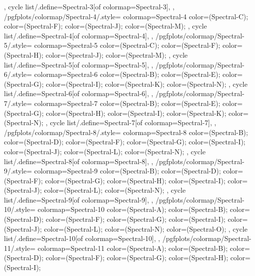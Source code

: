 {{{    },
    cycle list/.define={Spectral-3}{[of colormap=Spectral-3]},
  },
  /pgfplots/colormap/Spectral-4/.style={
    colormap={Spectral-4}{
      color=(Spectral-C);
      color=(Spectral-F);
      color=(Spectral-J);
      color=(Spectral-M);
    },
    cycle list/.define={Spectral-4}{[of colormap=Spectral-4]},
  },
  /pgfplots/colormap/Spectral-5/.style={
    colormap={Spectral-5}{
      color=(Spectral-C);
      color=(Spectral-F);
      color=(Spectral-H);
      color=(Spectral-J);
      color=(Spectral-M);
    },
    cycle list/.define={Spectral-5}{[of colormap=Spectral-5]},
  },
  /pgfplots/colormap/Spectral-6/.style={
    colormap={Spectral-6}{
      color=(Spectral-B);
      color=(Spectral-E);
      color=(Spectral-G);
      color=(Spectral-I);
      color=(Spectral-K);
      color=(Spectral-N);
    },
    cycle list/.define={Spectral-6}{[of colormap=Spectral-6]},
  },
  /pgfplots/colormap/Spectral-7/.style={
    colormap={Spectral-7}{
      color=(Spectral-B);
      color=(Spectral-E);
      color=(Spectral-G);
      color=(Spectral-H);
      color=(Spectral-I);
      color=(Spectral-K);
      color=(Spectral-N);
    },
    cycle list/.define={Spectral-7}{[of colormap=Spectral-7]},
  },
  /pgfplots/colormap/Spectral-8/.style={
    colormap={Spectral-8}{
      color=(Spectral-B);
      color=(Spectral-D);
      color=(Spectral-F);
      color=(Spectral-G);
      color=(Spectral-I);
      color=(Spectral-J);
      color=(Spectral-L);
      color=(Spectral-N);
    },
    cycle list/.define={Spectral-8}{[of colormap=Spectral-8]},
  },
  /pgfplots/colormap/Spectral-9/.style={
    colormap={Spectral-9}{
      color=(Spectral-B);
      color=(Spectral-D);
      color=(Spectral-F);
      color=(Spectral-G);
      color=(Spectral-H);
      color=(Spectral-I);
      color=(Spectral-J);
      color=(Spectral-L);
      color=(Spectral-N);
    },
    cycle list/.define={Spectral-9}{[of colormap=Spectral-9]},
  },
  /pgfplots/colormap/Spectral-10/.style={
    colormap={Spectral-10}{
      color=(Spectral-A);
      color=(Spectral-B);
      color=(Spectral-D);
      color=(Spectral-F);
      color=(Spectral-G);
      color=(Spectral-I);
      color=(Spectral-J);
      color=(Spectral-L);
      color=(Spectral-N);
      color=(Spectral-O);
    },
    cycle list/.define={Spectral-10}{[of colormap=Spectral-10]},
  },
  /pgfplots/colormap/Spectral-11/.style={
    colormap={Spectral-11}{
      color=(Spectral-A);
      color=(Spectral-B);
      color=(Spectral-D);
      color=(Spectral-F);
      color=(Spectral-G);
      color=(Spectral-H);
      color=(Spectral-I);
}}}

